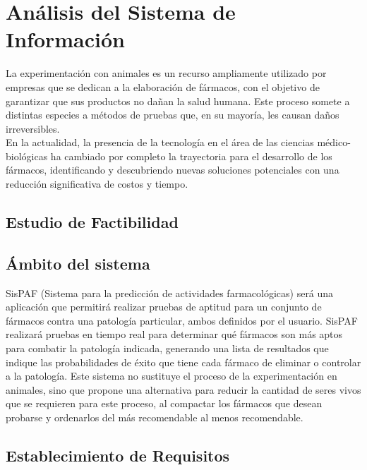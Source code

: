 \rhead{\newtitle}
\cfoot{\thepage}
\renewcommand{\headrulewidth}{1pt}
\renewcommand{\footrulewidth}{1pt}

\chapter{Análisis del Sistema de Información}\label{ch_3}
\noindent La experimentación con animales es un recurso ampliamente utilizado por empresas que se dedican a la elaboración de fármacos, con el objetivo de garantizar que sus productos no dañan la salud humana. Este proceso somete a distintas especies a métodos de pruebas que, en su mayoría, les causan daños irreversibles. \\
En la actualidad, la presencia de la tecnología en el área de las ciencias médico-biológicas ha cambiado por completo la trayectoria para el desarrollo de los fármacos, identificando y descubriendo nuevas soluciones potenciales con una reducción significativa de costos y tiempo.
\newpage
\section{Estudio de Factibilidad}

\section{Ámbito del sistema}
\noindent SisPAF (Sistema para la predicción de actividades farmacológicas) será una aplicación que permitirá realizar pruebas de aptitud para un conjunto de fármacos contra una patología particular, ambos definidos por el usuario.
SisPAF realizará pruebas en tiempo real para determinar qué fármacos son más aptos para combatir la patología indicada, generando una lista de resultados que indique las probabilidades de éxito que tiene cada fármaco de eliminar o controlar a la patología. 
Este sistema no sustituye el proceso de la experimentación en animales, sino que propone una alternativa para reducir la cantidad de seres vivos que se requieren para este proceso, al compactar los fármacos que desean probarse y ordenarlos del más recomendable al menos recomendable.
\section{Establecimiento de Requisitos}
